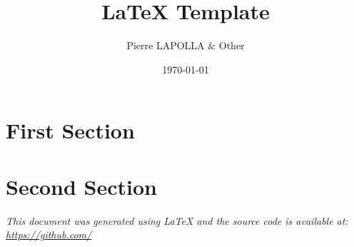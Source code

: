 \documentclass[10pt]{article}
\title{\LaTeX{} Template}
\author{Pierre LAPOLLA \& Other}
\date{\today}
\begin{document}
    \maketitle

    \tableofcontents


    \section{First Section}\label{sec:first-section}
    


    \section{Second Section}\label{sec:second-section}
    

    \vfill
    \begin{center}
        \textit{This document was generated using \LaTeX{} and the source code is available at: \\
        \url{https://github.com/}}
    \end{center}
\end{document}
